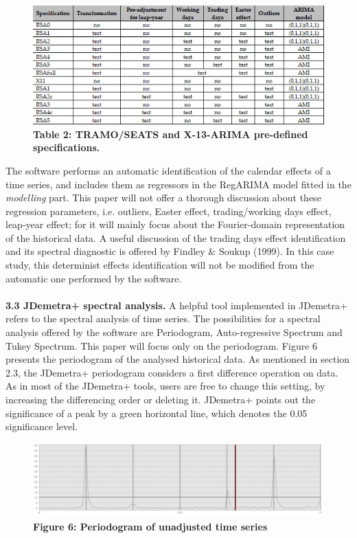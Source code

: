 \documentclass{article}
\begin{document}
\begin{figure}[H]
\centering
  \includegraphics[width=\linewidth]{../images/capitolo3/specification.jpg}
  {\textbf{\scriptsize Table 2: TRAMO/SEATS and X-13-ARIMA pre-defined specifications. }}
\end{figure}
The software performs an automatic identification of the calendar effects of a time series, and includes them as regressors in the RegARIMA model fitted in the \textit{modelling} part. This paper will not offer a thorough discussion about these regression parameters, i.e. outliers, Easter effect, trading/working days effect, leap-year effect; for it will mainly focus about the Fourier-domain representation of the historical data. A useful discussion of the trading days effect identification and its spectral diagnostic is offered by Findley \& Soukup (1999). In this case study, this determinist effects identification will not be modified from the automatic one performed by the software.\\
\bigskip\\
\textbf{\small 3.3 JDemetra+ spectral analysis.}
A helpful tool implemented in JDemetra+ refers to the spectral analysis of time series. The possibilities for a spectral analysis offered by the software are Periodogram, Auto-regressive Spectrum and Tukey Spectrum. This paper will focus only on the periodogram. Figure 6 presents the periodogram of the analysed historical data. As mentioned in section 2.3, the JDemetra+ periodogram considers a first difference operation on data. As in most of the JDemetra+ tools, users are free to change this setting, by increasing the differencing order or deleting it. JDemetra+ points out the significance of a peak by a green horizontal line, which denotes the 0.05 significance level.
\begin{figure}[H]
\centering
  \includegraphics[width=\linewidth]{../images/capitolo3/amsper.jpg}
  {\textbf{\scriptsize Figure 6: Periodogram of unadjusted time series}}
\end{figure}
\end{document}
